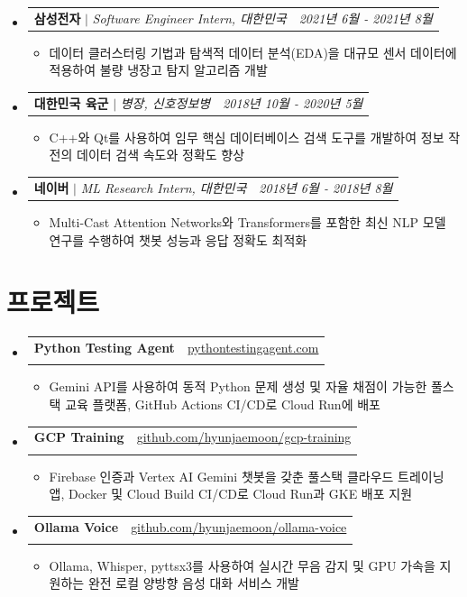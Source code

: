 \documentclass[10pt]{article}
\makeatletter
\newcommand{\resumeItem}[1]{\item\small{#1}}
\newcommand{\resumeSubheading}[4]{
  \vspace{-2pt}\item[]
    \begin{tabular*}{\linewidth}[t]{l@{\extracolsep{\fill}}r}
      \textbf{#1} & #2 \\
      \textit{\small#3} & \textit{\small #4} \\
    \end{tabular*}\vspace{-5pt}
}
\newcommand{\resumeCompactHeading}[3]{
  \vspace{-2pt}\item[]
    \begin{tabular*}{\linewidth}[t]{l@{\extracolsep{\fill}}r}
      \textbf{#1} $|$ \textit{\small #2} & \textit{\small #3} \\
    \end{tabular*}\vspace{-5pt}
}
\makeatother
\begin{document}
\begin{itemize}[leftmargin=0.15in, label={}, itemsep=0pt]
    \resumeCompactHeading
        {삼성전자}{Software Engineer Intern, 대한민국}{2021년 6월 - 2021년 8월}
        \begin{itemize}[leftmargin=0.2in, itemsep=0pt]
            \resumeItem{데이터 클러스터링 기법과 탐색적 데이터 분석(EDA)을 대규모 센서 데이터에 적용하여 불량 냉장고 탐지 알고리즘 개발}
        \end{itemize}

    \resumeCompactHeading
        {대한민국 육군}{병장, 신호정보병}{2018년 10월 - 2020년 5월}
        \begin{itemize}[leftmargin=0.2in, itemsep=0pt]
            \resumeItem{C++와 Qt를 사용하여 임무 핵심 데이터베이스 검색 도구를 개발하여 정보 작전의 데이터 검색 속도와 정확도 향상}
        \end{itemize}

    \resumeCompactHeading
        {네이버}{ML Research Intern, 대한민국}{2018년 6월 - 2018년 8월}
        \begin{itemize}[leftmargin=0.2in, itemsep=0pt]
            \resumeItem{Multi-Cast Attention Networks와 Transformers를 포함한 최신 NLP 모델 연구를 수행하여 챗봇 성능과 응답 정확도 최적화}
        \end{itemize}

\end{itemize}

\section{프로젝트}
\begin{itemize}[leftmargin=0.15in, label={}, itemsep=0pt]
    \resumeSubheading
        {Python Testing Agent}{\href{https://pythontestingagent.com}{pythontestingagent.com}}
        {}{}
        \begin{itemize}[leftmargin=0.2in, itemsep=0pt]
            \resumeItem{Gemini API를 사용하여 동적 Python 문제 생성 및 자율 채점이 가능한 풀스택 교육 플랫폼, GitHub Actions CI/CD로 Cloud Run에 배포}
        \end{itemize}

    \resumeSubheading
        {GCP Training}{\href{https://github.com/hyunjaemoon/gcp-training}{github.com/hyunjaemoon/gcp-training}}
        {}{}
        \begin{itemize}[leftmargin=0.2in, itemsep=0pt]
            \resumeItem{Firebase 인증과 Vertex AI Gemini 챗봇을 갖춘 풀스택 클라우드 트레이닝 앱, Docker 및 Cloud Build CI/CD로 Cloud Run과 GKE 배포 지원}
        \end{itemize}

    \resumeSubheading
        {Ollama Voice}{\href{https://github.com/hyunjaemoon/ollama-voice}{github.com/hyunjaemoon/ollama-voice}}
        {}{}
        \begin{itemize}[leftmargin=0.2in, itemsep=0pt]
            \resumeItem{Ollama, Whisper, pyttsx3를 사용하여 실시간 무음 감지 및 GPU 가속을 지원하는 완전 로컬 양방향 음성 대화 서비스 개발}
        \end{itemize}

\end{itemize}
\end{document}
